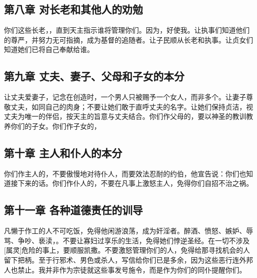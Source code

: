 \subsection{第八章  对长老和其他人的劝勉}

你们这些长老，，直到天主指示谁将管理你们。因为，好使我。让执事们知道他们的尊严，并努力无可指摘，成为基督的追随者。让子民顺从长老和执事。让贞女们知道她们已将自己奉献给谁。\par


\subsection{第九章  丈夫、妻子、父母和子女的本分}

让丈夫爱妻子，记念在创造时，一个男人只被赐予一个女人，而非多个。让妻子尊敬丈夫，如同自己的肉身；不要让她们敢于直呼丈夫的名字。让她们保持贞洁，视丈夫为唯一的伴侣，按天主的旨意与丈夫结合。你们作父母的，要以神圣的教训教养你们的子女。你们作子女的，\par


\subsection{第十章  主人和仆人的本分}

你们作主人的，不要傲慢地对待仆人，而要效法忍耐的约伯，他宣告说：你们也知道接下来的话。你们作仆人的，不要在凡事上激怒主人，免得你们自招不治之祸。\par


\subsection{第十一章  各种道德责任的训导}

凡懒于作工的人不可吃饭，免得他闲游浪荡，成为奸淫者。醉酒、愤怒、嫉妒、辱骂、争吵、亵渎，。不要让寡妇过享乐的生活，免得她们悖逆圣经。在一切不涉及[属灵]危险的事上，要顺服凯撒。不要激怒管理你们的人，免得给那寻找机会的人留下把柄。至于行邪术、男色或杀人，写信给你们已是多余，因为这些恶行连外邦人也禁止。我并非作为宗徒就这些事发号施令，而是作为你们的同仆提醒你们。\par

